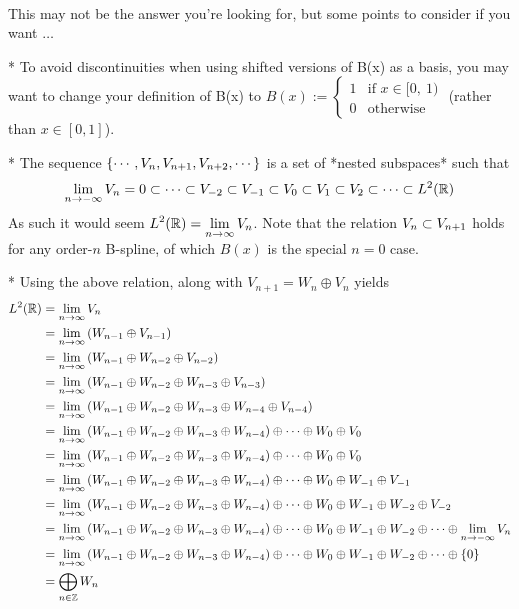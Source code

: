 $\newcommand{\pP}{P}$
$\newcommand{\ds}{\displaystyle}$
$\newcommand{\RR}{\mathbb{R}}$
$\newcommand{\NN}{\mathbb{N}}$
$\newcommand{\ZZ}{\mathbb{Z}}$
$\newcommand{\brp}[1]{\left(#1\right)}$
$\newcommand{\setn}[1]{\left\{#1\right\}}$
$\newcommand{\set}[2]{\left\{#1|#2\right\}}$
$\newcommand{\linspan}{{{s\!p\!a\!n}}}$

This may not be the answer you're looking for, but some points to consider if you want $\ldots$

* To avoid discontinuities when using shifted versions of B(x) as a basis, 
you may want to change your definition of B(x) to 
$B(x):= \begin{cases} 1 & \text{if } x \in [0,\ 1) \\
0 & \text{otherwise} \end{cases}$  
(rather than $x\in[0,1]$).

* The sequence $\setn{\cdots,V_n, V_{n+1}, V_{n+2},\cdots}$ is a set of *nested subspaces* such that
$$\ds \lim_{n\to-\infty}V_n = 0 \subset \cdots \subset V_{-2} \subset V_{-1} \subset V_0 \subset V_1 \subset V_2 \subset \cdots \subset L^2(\RR)$$
As such it would seem
$\ds L^{2}(\RR) = \lim_{n\to\infty} V_{n}$.
Note that the relation $\ds V_{n} \subset V_{n+1}$ holds for any order-$n$ B-spline, of which $B(x)$ is the special $n=0$ case.

* Using the above relation, along with $V_{n+1} = W_{n} \oplus V_{n}$ yields
\begin{align*}
L^{2}(\RR) 
  &= {\lim_{n\to\infty} V_{n}}
\\&= {\lim_{n\to\infty} \brp{ W_{n-1} \oplus V_{n-1} } }
\\&= {\lim_{n\to\infty} \brp{ W_{n-1} \oplus W_{n-2} \oplus V_{n-2} } }
\\&= {\lim_{n\to\infty} \brp{ W_{n-1} \oplus W_{n-2} \oplus W_{n-3} \oplus V_{n-3} } }
\\&= {\lim_{n\to\infty} \brp{ W_{n-1} \oplus W_{n-2} \oplus W_{n-3} \oplus W_{n-4} \oplus V_{n-4} } }
\\&= {\lim_{n\to\infty} \brp{ W_{n-1} \oplus W_{n-2} \oplus W_{n-3} \oplus W_{n-4} } \oplus \cdots \oplus W_{0} \oplus V_{0} }
\\&= {\lim_{n\to\infty} \brp{ W_{n-1} \oplus W_{n-2} \oplus W_{n-3} \oplus W_{n-4} } \oplus \cdots \oplus W_{0} \oplus V_{0} }
\\&= {\lim_{n\to\infty} \brp{ W_{n-1} \oplus W_{n-2} \oplus W_{n-3} \oplus W_{n-4} } \oplus \cdots \oplus W_{0} \oplus W_{-1} \oplus V_{-1} }
\\&= {\lim_{n\to\infty} \brp{ W_{n-1} \oplus W_{n-2} \oplus W_{n-3} \oplus W_{n-4} } \oplus \cdots \oplus W_{0} \oplus W_{-1} \oplus W_{-2} \oplus V_{-2} }
\\&= {\lim_{n\to\infty} \brp{ W_{n-1} \oplus W_{n-2} \oplus W_{n-3} \oplus W_{n-4} } \oplus \cdots \oplus W_{0} \oplus W_{-1} \oplus W_{-2} \oplus\cdots\oplus\lim_{n\to-\infty} V_n }
\\&= {\lim_{n\to\infty} \brp{ W_{n-1} \oplus W_{n-2} \oplus W_{n-3} \oplus W_{n-4} } \oplus \cdots \oplus W_{0} \oplus W_{-1} \oplus W_{-2} \oplus\cdots\oplus\setn{0} }
\\&= {\bigoplus_{n\in\ZZ} W_n }
\end{align*}

